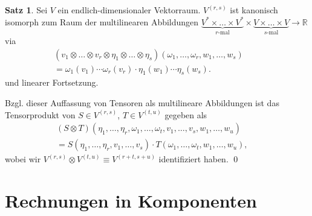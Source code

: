 \documentclass[a4paper]{scrbook}
\numberwithin{equation}{chapter}
\newcommand{\R}{\mathbb{R}}
\theoremstyle{definition}
\newtheorem{satz}[defn]{Satz}
\begin{document}
\begin{satz} \label{satz:tensorprod_multilin}
	Sei $V$ ein endlich-dimensionaler Vektorraum. $V^{(r,s)}$ ist kanonisch isomorph zum Raum der multilinearen Abbildungen $\underbrace{V^* \times \dots \times V^*}_\text{$r$-mal} \times \underbrace{V \times \dots \times V}_\text{$s$-mal} \to \R$ via
	\begin{align*}
		(v_1 \otimes \dots \otimes v_r \otimes \eta_1 \otimes \dots \otimes \eta_s ) (\omega_1,\dots,\omega_r, w_1,\dots,w_s) \qquad \\ = \omega_1(v_1)\cdots\omega_r(v_r) \cdot \eta_1(w_1)\cdots\eta_s(w_s).
	\end{align*}
	und linearer Fortsetzung.

	Bzgl. dieser Auffassung von Tensoren als multilineare Abbildungen ist das Tensorprodukt von $S \in V^{(r,s)}$, $T \in V^{(t,u)}$ gegeben als
	\begin{align*}
		(S\otimes T)(\eta_1,\dots,\eta_r, \omega_1,\dots,\omega_t, v_1,\dots,v_s, w_1,\dots,w_u) \qquad \\ = S(\eta_1,\dots,\eta_r, v_1,\dots,v_s) \cdot T(\omega_1,\dots,\omega_t, w_1,\dots,w_u) ,
	\end{align*}
	wobei wir $V^{(r,s)} \otimes V^{(t,u)} \equiv V^{(r+t, s+u)}$ identifiziert haben. \qed
\end{satz}

\section{Rechnungen in Komponenten}
\end{document}
